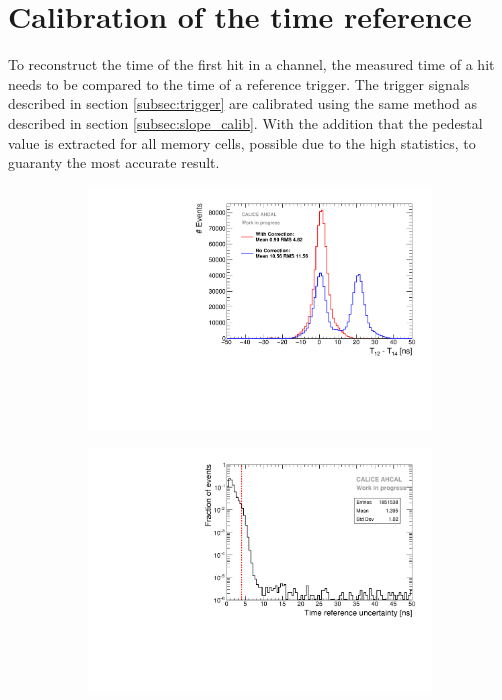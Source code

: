 \section{Calibration of the time reference}
\label{section:time_ref}

To reconstruct the time of the first hit in a channel, the measured time of a hit needs to be compared to the time of a reference trigger. The trigger signals described in section \ref{subsec:trigger} are calibrated using the same method as described in section \ref{subsec:slope_calib}. With the addition that the pedestal value is extracted for all memory cells, possible due to the high statistics, to guaranty the most accurate result.

\begin{figure}[htbp!]
	\begin{subfigure}[t]{0.49\textwidth}
		\centering
		\includegraphics[width=1\textwidth]{../Thesis_Plots/Timing/T0s/Plots/T0_Resolution_5.pdf}
		\caption{}	\label{fig:T0_Correction}
	\end{subfigure}
	\hfill
	\begin{subfigure}[t]{0.49\textwidth}
		\centering
		\includegraphics[width=1\linewidth]{../Thesis_Plots/Timing/T0s/Plots/T0ReferenceError}

\end{subfigure}
\end{figure}
